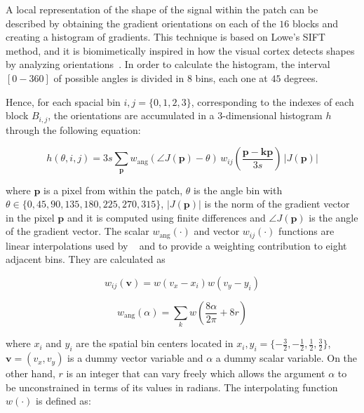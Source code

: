 \documentclass[utf8]{frontiersSCNS} %
\begin{document}
A local representation of the shape of the signal within the patch can be described by obtaining the gradient orientations on each of the $16$ blocks and creating a histogram of gradients.  This technique is based on Lowe's SIFT~\citep{Lowe2004} method, and it is biomimetically inspired in how the visual cortex detects shapes by analyzing orientations~\citep{cogprints561}.   In order to calculate the histogram, the interval $[0-360]$ of possible angles is divided in $8$ bins, each one at $45$ degrees.

 Hence, for each spacial bin $ i,j = \{0,1,2,3\} $, corresponding to the indexes of each block $B_{i,j}$,  the orientations are accumulated in a  $3$-dimensional histogram $h$ through the following equation: 
 

\begin{equation}
 h(\theta,i,j) = 3 s \sum_{\mathbf{p}} w_\mathrm{ang}(\angle J(\mathbf{p}) - \theta)\, w_{ij}\left(\frac{\mathbf{p} - \mathbf{kp}}{3 s}\right)\, |J(\mathbf{p})|
\label{eq:histogram}
\end{equation}

\noindent  where $\mathbf{p}$ is a pixel from within the patch,  $\theta$ is the angle bin with $ \theta \in \{0, 45, 90, 135, 180, 225, 270, 315\} $,  $ |J(\mathbf{p})| $ is the norm of the gradient vector in the pixel $\mathbf{p}$ and it is computed using finite differences and $\angle J(\mathbf{p}) $ is the angle of the gradient vector.  The scalar $ w_\mathrm{ang}(\cdot) $  and vector $ w_{ij}(\cdot) $ functions are linear interpolations used by ~\cite{Lowe2004} and \cite{Vedaldi2010} to provide a weighting contribution to eight adjacent bins.  They are calculated as  

\begin{equation}
 w_{ij}(\mathbf{v}) = w( v_x - x_i ) w( v_y - y_i ) 
\label{eq:ij}
\end{equation}

\begin{equation}
 w_\mathrm{ang}(\alpha) = \sum_{k} w( \frac{8\alpha}{2\pi} + 8r)
\label{eq:wang}
\end{equation}

\noindent where $x_i$ and $y_i$ are the spatial bin centers located in $ x_i,y_i = \{-\frac{3}{2},-\frac{1}{2},\frac{1}{2},\frac{3}{2}\} $, $\mathbf{v} = ( v_x, v_y ) $ is a dummy vector variable and $\alpha$ a dummy scalar variable.  On the other hand, $r$ is an integer that can vary freely which allows the argument $\alpha$ to be unconstrained in terms of its values in radians. The interpolating function $w(\cdot)$ is defined as:
\end{document}
